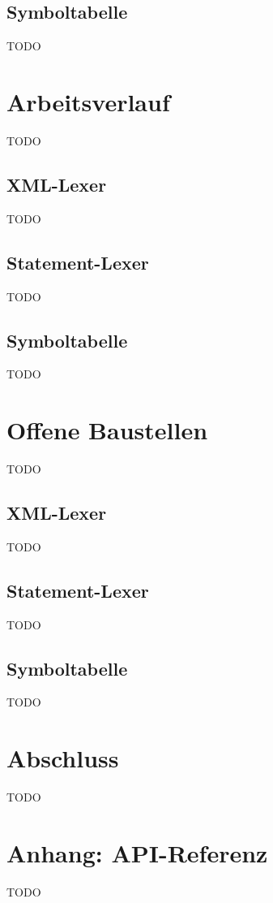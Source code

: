 \documentclass[10pt,a4paper,ngerman,titlepage,tocindentauto]{article}
\begin{document}
		\subsection{Symboltabelle}
			TODO
	
	\section{Arbeitsverlauf}
		TODO
	
		\subsection{XML-Lexer}
			TODO
	
		\subsection{Statement-Lexer}
			TODO
	
		\subsection{Symboltabelle}
			TODO
	
	\section{Offene Baustellen}
		TODO
	
		\subsection{XML-Lexer}
			TODO
	
		\subsection{Statement-Lexer}
			TODO
	
		\subsection{Symboltabelle}
			TODO
	
	\section{Abschluss}
		TODO
	
	\section{Anhang: API-Referenz}
		TODO
	
\end{document}
